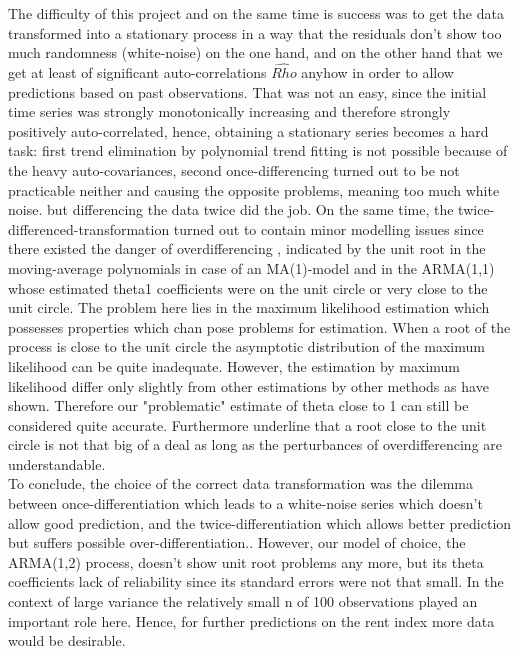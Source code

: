 \documentclass[11pt,a4paper]{article}
\begin{document}
The difficulty of this project and on the same time is success was to get the data transformed into a stationary process in a way that the residuals don't show too much randomness (white-noise) on the one hand, and on the other hand that we get at least of significant auto-correlations $\hat{Rho}$ anyhow in order to allow predictions based on past observations. That was not an easy, since the initial time series was strongly monotonically increasing and therefore strongly positively auto-correlated, hence, obtaining a stationary series becomes a hard task: first trend elimination by polynomial trend fitting is not possible because of the heavy auto-covariances, second once-differencing turned out to be not practicable neither and causing the opposite problems, meaning too much white noise.  but differencing the data twice did the job. On the same time, the twice-differenced-transformation turned out to contain minor modelling issues since there existed the danger of overdifferencing \cite[~p.194]{bd02}, indicated by the unit root in the moving-average polynomials in case of an MA(1)-model and in the ARMA(1,1) whose estimated theta1 coefficients were on the unit circle or very close to the unit circle. The problem here lies in the maximum likelihood estimation which possesses properties which chan pose problems for estimation\citep{davidson81}. When a root of the process is close to the unit circle the asymptotic distribution of the maximum likelihood can be quite inadequate. However, the estimation by maximum likelihood differ only slightly from other estimations by other methods as  \citep{davisdunsmuir96} have shown. Therefore our "problematic" estimate of theta close to 1 can still be considered quite accurate. Furthermore \citep{plosser77} underline that a root close to the unit circle is not that big of a deal as long as the perturbances of overdifferencing are understandable.\\ 
To conclude, the choice of the correct data transformation was the dilemma between once-differentiation which leads to a white-noise series which doesn't allow good prediction, and the twice-differentiation which allows better prediction but suffers possible over-differentiation..
However, our model of choice, the ARMA(1,2) process, doesn't show unit root problems any more, but its theta coefficients lack of reliability since its standard errors were not that small. In the context of large variance the relatively small n of 100 observations played an important role here. Hence, for further predictions on the rent index more data would be desirable.
\end{document}
